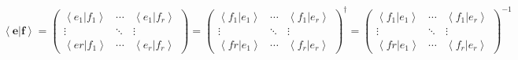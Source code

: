 \documentclass[aps,preprint]{revtex4}
\begin{document}
\begin{equation}
\left\langle \left. \boldsymbol{e}\right\vert \boldsymbol{f}\right\rangle
=\left( 
\begin{array}{ccc}
\left\langle \left. e_{1}\right\vert f_{1}\right\rangle & \cdots & 
\left\langle \left. e_{1}\right\vert f_{r}\right\rangle \\ 
\vdots & \ddots & \vdots \\ 
\left\langle \left. er\right\vert f_{1}\right\rangle & \cdots & \left\langle
\left. e_{r}\right\vert f_{r}\right\rangle%
\end{array}%
\right) =\left( 
\begin{array}{ccc}
\left\langle \left. f_{1}\right\vert e_{1}\right\rangle & \cdots & 
\left\langle \left. f_{1}\right\vert e_{r}\right\rangle \\ 
\vdots & \ddots & \vdots \\ 
\left\langle \left. fr\right\vert e_{1}\right\rangle & \cdots & \left\langle
\left. f_{r}\right\vert e_{r}\right\rangle%
\end{array}%
\right) ^{\dagger }=\left( 
\begin{array}{ccc}
\left\langle \left. f_{1}\right\vert e_{1}\right\rangle & \cdots & 
\left\langle \left. f_{1}\right\vert e_{r}\right\rangle \\ 
\vdots & \ddots & \vdots \\ 
\left\langle \left. fr\right\vert e_{1}\right\rangle & \cdots & \left\langle
\left. f_{r}\right\vert e_{r}\right\rangle%
\end{array}%
\right) ^{-1}
\end{equation}
\end{document}
